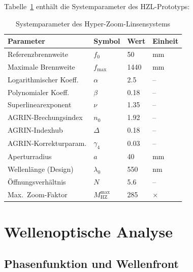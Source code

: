 ﻿\documentclass[12pt,a4paper]{article}
\theoremstyle{definition}
\newcommand{\HZ}{\mathrm{HZ}}
\begin{document}
	Tabelle~\ref{tab:params} enthält die Systemparameter des HZL-Prototyps:
	
	\begin{table}[H]
		\centering
		\caption{Systemparameter des Hyper-Zoom-Linsensystems}
		\label{tab:params}
		\begin{tabular}{llll}
			\toprule
			\textbf{Parameter} & \textbf{Symbol} & \textbf{Wert} & \textbf{Einheit}\\
			\midrule
			\rowcolor{blue!8}
			Referenzbrennweite        & $f_0$      & 50    & mm \\
			Maximale Brennweite       & $f_{\mathrm{max}}$   & 1440  & mm \\
			\rowcolor{blue!8}
			Logarithmischer Koeff.    & $\alpha$   & 2.5   & --  \\
			Polynomialer Koeff.       & $\beta$    & 0.18  & --  \\
			\rowcolor{blue!8}
			Superlinearexponent       & $\nu$      & 1.35  & --  \\
			AGRIN-Brechungsindex      & $n_0$      & 1.92  & --  \\
			\rowcolor{blue!8}
			AGRIN-Indexhub            & $\Delta$   & 0.18  & --  \\
			AGRIN-Korrekturparam.     & $\gamma_4$ & 0.03  & --  \\
			\rowcolor{blue!8}
			Aperturradius             & $a$        & 40    & mm  \\
			Wellenlänge (Design)      & $\lambda_0$& 550   & nm  \\
			\rowcolor{blue!8}
			Öffnungsverhältnis        & $N$        & 5.6   & --  \\
			Max.\ Zoom-Faktor         & $M_{\HZ}^{\mathrm{max}}$& 285 & $\times$ \\
			\bottomrule
		\end{tabular}
	\end{table}
	
	\section{Wellenoptische Analyse}
	
	\subsection{Phasenfunktion und Wellenfront}
	
\end{document}
